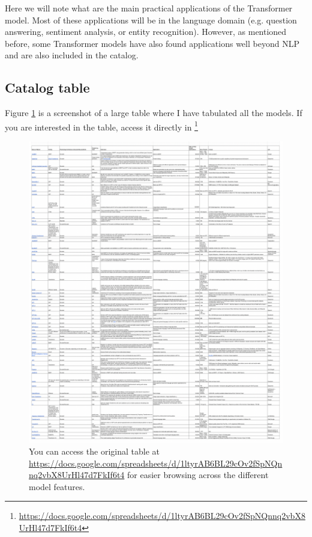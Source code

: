 \documentclass{article}
\begin{document}
Here we will note what are the main practical applications of the Transformer model. Most of these applications will be in the language domain (e.g. question answering, sentiment analysis, or entity recognition). However, as mentioned before, some Transformer models have also found applications well beyond NLP and are also included in the catalog.

\subsection{Catalog table}

Figure \ref{fig:table} is a screenshot of a large table where I have tabulated all the models. If you are interested in the table, access it directly in \footnote{\url{https://docs.google.com/spreadsheets/d/1ltyrAB6BL29cOv2fSpNQnnq2vbX8UrHl47d7FkIf6t4}}

\begin{figure}
    \centering
    \includegraphics[width=\textwidth,height=\textheight,keepaspectratio]{02-04.png}
    \caption{You can access the original table at \url{https://docs.google.com/spreadsheets/d/1ltyrAB6BL29cOv2fSpNQnnq2vbX8UrHl47d7FkIf6t4} for easier browsing across the different model features.}
    \label{fig:table}
\end{figure}
\end{document}
